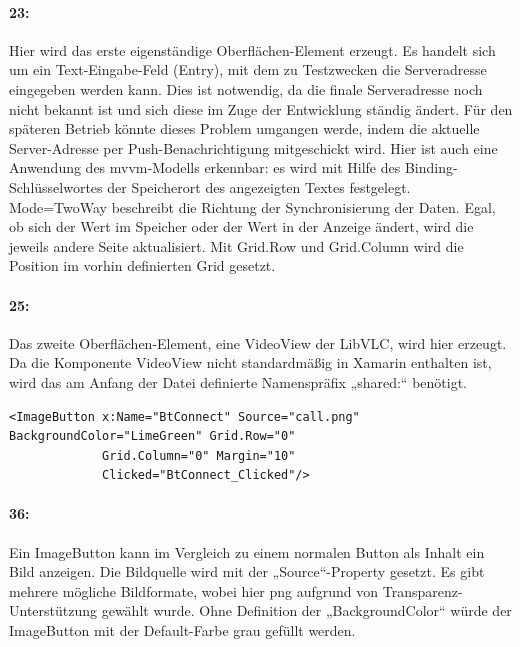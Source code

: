 \paragraph{23:} Hier wird das erste eigenständige Oberflächen-Element erzeugt. Es handelt sich um ein Text-Eingabe-Feld (Entry), mit dem zu Testzwecken die Serveradresse eingegeben werden kann. Dies ist notwendig, da die finale Serveradresse noch nicht bekannt ist und sich diese im Zuge der Entwicklung ständig ändert. Für den späteren Betrieb könnte dieses Problem umgangen werde, indem die aktuelle Server-Adresse per Push-Benachrichtigung mitgeschickt wird. Hier ist auch eine Anwendung des \ac{mvvm}-Modells erkennbar: es wird mit Hilfe des Binding-Schlüsselwortes der Speicherort des angezeigten Textes festgelegt. Mode=TwoWay beschreibt die Richtung der Synchronisierung der Daten. Egal, ob sich der Wert im Speicher oder der Wert in der Anzeige ändert, wird die jeweils andere Seite aktualisiert. Mit Grid.Row und Grid.Column wird die Position im vorhin definierten Grid gesetzt.
\paragraph{25:} Das zweite Oberflächen-Element, eine VideoView der LibVLC, wird hier erzeugt. Da die Komponente VideoView nicht standardmäßig in Xamarin enthalten ist, wird das am Anfang der Datei definierte Namenspräfix „shared:“ benötigt.

\begin{verbatim}
<ImageButton x:Name="BtConnect" Source="call.png" BackgroundColor="LimeGreen" Grid.Row="0"
             Grid.Column="0" Margin="10"
             Clicked="BtConnect_Clicked"/>
\end{verbatim}
\paragraph{36:} Ein ImageButton kann im Vergleich zu einem normalen Button als Inhalt ein Bild anzeigen. Die Bildquelle wird mit der „Source“-Property gesetzt. Es gibt mehrere mögliche Bildformate, wobei hier \ac{png} aufgrund von Transparenz-Unterstützung gewählt wurde. Ohne Definition der „BackgroundColor“ würde der ImageButton mit der Default-Farbe grau gefüllt werden.
